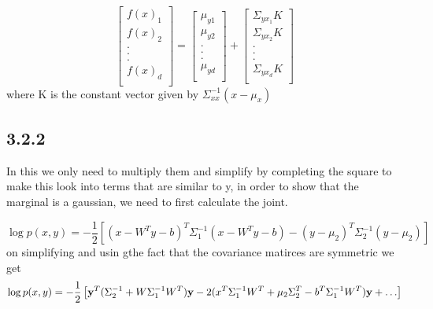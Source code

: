 \begin{equation}
    \begin{bmatrix}
    f(x)_1 \\
    f(x)_2 \\
    . \\
    . \\
    . \\
    f(x)_d \\
    \end{bmatrix}
     =   \begin{bmatrix}
    \mu_{y1} \\
    \mu_{y2} \\
    . \\
    . \\
    . \\
    \mu_{yd} \\
    \end{bmatrix}
      + 
        \begin{bmatrix}
    \Sigma_{yx_1}K \\
     \Sigma_{yx_2}K \\
    . \\
    . \\
    . \\
     \Sigma_{yx_d}K \\
    \end{bmatrix}
\end{equation}
where K is the constant vector given by $\Sigma_{xx}^{-1}(x - \mu_x)$

\subsection{3.2.2}
In this we only need to multiply them and simplify by completing the square
to make this look into terms that are similar to y, in order to show that the marginal is a gaussian, we need to first calculate the joint.

\begin{equation}
   \log p(x, y) = -\frac{1}{2} \left [(x - W^Ty - b)^T \Sigma_1^{-1} (x - W^Ty - b) - (y - \mu_2)^T\Sigma_2^{-1}(y - \mu_2) \right]
\end{equation}
on simplifying and usin gthe fact that the covariance matirces are symmetric we get
\begin{equation}
   \log p(x, y) = -\frac{1}{2} \left [\vb{y}^T(\Sigma_2^{-1} + W \Sigma_1^{-1} W^T)\vb{y} -2(x^T\Sigma_1^{-1} W^T + \mu_2 \Sigma_2^T  - b^T\Sigma_1^{-1}W^T)\vb{y} + \ldots \right]
\end{equation}

